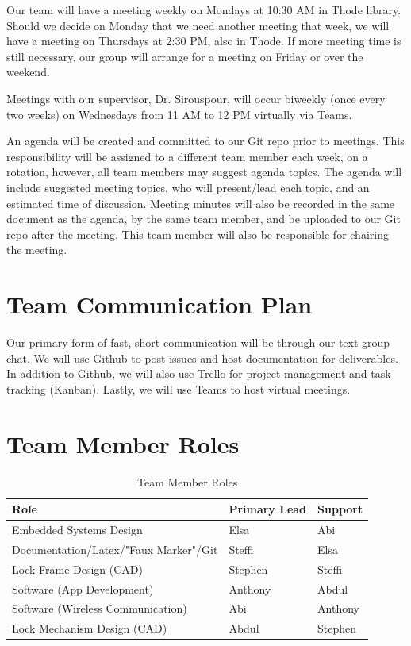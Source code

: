 \documentclass{article}
\begin{document}
Our team will have a meeting weekly on Mondays at 10:30 AM in Thode library.  Should we decide on Monday that we need another meeting that week, we will have a meeting on Thursdays at 2:30 PM, also in Thode.  If more meeting time is still necessary, our group will arrange for a meeting on Friday or over the weekend.

Meetings with our supervisor, Dr. Sirouspour, will occur biweekly (once every two weeks) on Wednesdays from 11 AM to 12 PM virtually via Teams.

An agenda will be created and committed to our Git repo prior to meetings.  This responsibility will be assigned to a different team member each week, on a rotation, however, all team members may suggest agenda topics.  The agenda will include suggested meeting topics, who will present/lead each topic, and an estimated time of discussion. Meeting minutes will also be recorded in the same document as the agenda, by the same team member, and be uploaded to our Git repo after the meeting.  This team member will also be responsible for chairing the meeting. 

\section{Team Communication Plan}

Our primary form of fast, short communication will be through our text group chat. We will use Github to post issues and host documentation for deliverables.  In addition to Github, we will also use Trello for project management and task tracking (Kanban).  Lastly, we will use Teams to host virtual meetings.

\section{Team Member Roles}

\begin{table}[h]
\caption{Team Member Roles} \label{TblTeamMemberRoles}
\begin{tabularx}{\textwidth}{llX}
\toprule
\textbf{Role} & \textbf{Primary Lead} & \textbf{Support}\\
\midrule
Embedded Systems Design & Elsa & Abi\\
Documentation/Latex/"Faux Marker"/Git & Steffi & Elsa\\
Lock Frame Design (CAD) & Stephen & Steffi\\
Software (App Development) & Anthony & Abdul\\
Software (Wireless Communication) & Abi & Anthony\\
Lock Mechanism Design (CAD) & Abdul & Stephen\\
\bottomrule
\end{tabularx}
\end{table}
\end{document}
